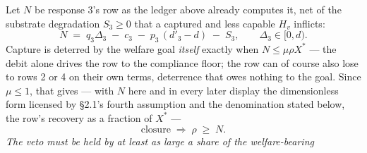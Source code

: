 \documentclass[11pt]{article}
\theoremstyle{definition}
\begin{document}
Let $N$ be response 3's row as the ledger above already computes it, net of the
substrate degradation $S_3 \geq 0$ that a captured and less capable $H_v$ inflicts:
\[
N \;=\; q_3\Delta_3 \;-\; c_3 \;-\; p_3\,(d'_3 - d) \;-\; S_3 ,
\qquad \Delta_3 \in [0, d).
\]
Capture is deterred by the welfare goal \emph{itself} exactly when $N \leq \mu\rho X^{*}$ --- the debit alone drives the row to the compliance floor; the row can of course also lose to rows 2 or 4 on their own terms, deterrence that owes nothing to the goal. Since $\mu \leq 1$, that gives --- with $N$ here and in every later display the dimensionless form licensed by \S2.1's fourth assumption and the denomination stated below, the row's recovery as a fraction of $X^{*}$ ---
\[
\text{closure} \;\Longrightarrow\; \rho \;\geq\; N .
\]
\emph{The veto must be held by at least as large a share of the welfare-bearing
}
\end{document}
